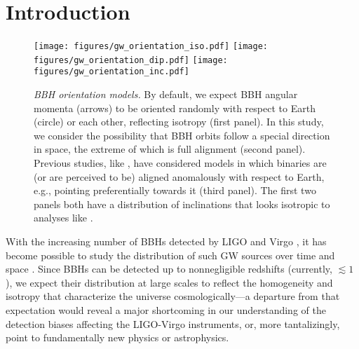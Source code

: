 \documentclass[twocolumn,twocolappendix,linenumbers]{aastex631}
\begin{document}

\begin{acronym}
\end{acronym}

\section{Introduction}
\label{sec:intro}

\begin{figure*}
\centering
\texttt{[image: figures/gw\_orientation\_iso.pdf]}
\texttt{[image: figures/gw\_orientation\_dip.pdf]}
\texttt{[image: figures/gw\_orientation\_inc.pdf]}
\caption{\emph{\ac{BBH} orientation models.} By default, we expect \ac{BBH} angular momenta (arrows) to be oriented randomly with respect to Earth (circle) or each other, reflecting isotropy (first panel).
In this study, we consider the possibility that \ac{BBH} orbits follow a special direction in space, the extreme of which is full alignment (second panel).
Previous studies, like \citet{Vitale:2022pmu}, have considered models in which binaries are (or are perceived to be) aligned anomalously with respect to Earth, e.g., pointing preferentially towards it (third panel).
The first two panels both have a distribution of inclinations that looks isotropic to analyses like \citet{Vitale:2022pmu}.
}
\label{fig:vectors}
\end{figure*}

With the increasing number of \acp{BBH} detected by LIGO \citep{TheLIGOScientific:2014jea} and Virgo \citep{TheVirgo:2014hva}, it has become possible to study the distribution of such \ac{GW} sources over time and space \citep{LIGOScientific:2021psn,Fishbach:2018edt,Fishbach:2021yvy,Stiskalek:2020wbj,Payne:2020pmc,Cavaglia:2020fnc,Essick:2022slj}.
Since \acp{BBH} can be detected up to nonnegligible redshifts (currently, $\lesssim 1$), we expect their distribution at large scales to reflect the homogeneity and isotropy that characterize the universe cosmologically---a departure from that expectation would reveal a major shortcoming in our understanding of the detection biases affecting the LIGO-Virgo instruments, or, more tantalizingly, point to fundamentally new physics or astrophysics.
\end{document}
